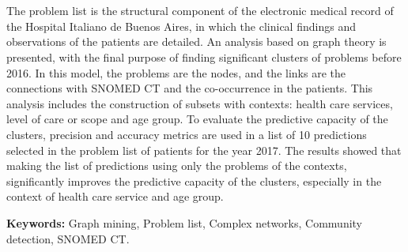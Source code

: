 \chapter*{\runtitle}

\noindent The problem list is the structural component of the electronic medical record of the Hospital Italiano de Buenos Aires, in which the clinical findings and observations of the patients are detailed. An analysis based on graph theory is presented, with the final purpose of finding significant clusters of problems before 2016. In this model, the problems are the nodes, and the links are the connections with SNOMED CT and the co-occurrence in the patients. This analysis includes the construction of subsets with contexts: health care services, level of care or scope and age group. To evaluate the predictive capacity of the clusters, precision and accuracy metrics are used in a list of 10 predictions selected in the problem list of patients for the year 2017. The results showed that making the list of predictions using only the problems of the contexts, significantly improves the predictive capacity of the clusters, especially in the context of health care service and age group.

\bigskip

\noindent\textbf{Keywords:} Graph mining, Problem list, Complex networks, Community detection, SNOMED CT.